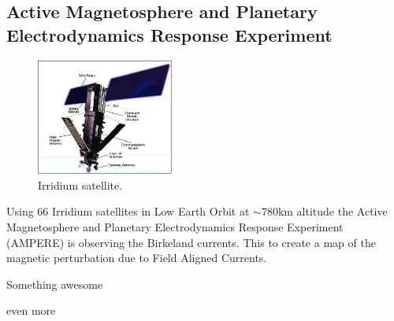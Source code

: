 \subsection{Active Magnetosphere and Planetary Electrodynamics Response Experiment}

\begin{figure} 
\vspace{-20pt}
  \begin{center}
    \includegraphics[width=0.4\textwidth]{Figures/Ampere/image_gallery.jpeg}
    \caption{Irridium satellite.}
    \label{fig:ACE}
  \end{center}
  \vspace{-10pt}
  \vspace{2pt}
\end{figure}

Using 66 Irridium satellites in Low Earth Orbit at $\sim 780$km altitude the Active Magnetosphere and Planetary Electrodynamics Response Experiment (AMPERE) is observing the Birkeland currents. This to create a map of the magnetic perturbation due to Field Aligned Currents. 


Something awesome


even more
